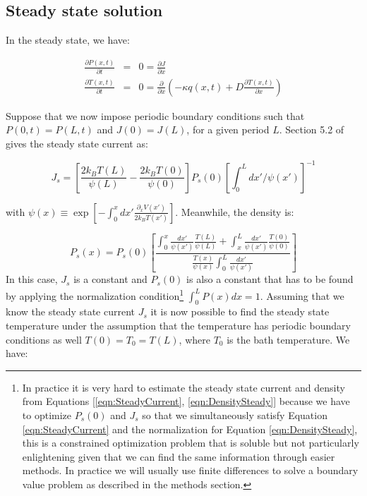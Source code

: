 \documentclass[11pt]{article} %
\begin{document}
\subsection{Steady state solution}
In the steady state, we have: 

\begin{eqnarray}
\frac{\partial P(x, t)}{\partial t} &=&  0 = \frac{\partial J}{\partial x} \label{eqn:SmoluchowskiSteady} \\
\frac{\partial T(x, t)}{\partial t} &=& 0 = \frac{\partial}{\partial x} \left ( -\kappa q(x, t) + D \frac{\partial T(x, t)}{\partial x} \right ) \label{eqn:TemperatureSteady}
\end{eqnarray} 

Suppose that we now impose periodic boundary conditions such that $P(0, t) = P(L, t)$ and $J(0) = J(L)$, for a given period $L$. Section 5.2 of \cite{Gardiner2009} gives the steady state current as:

\begin{equation}
J_s = \left [\frac{2 k_B T(L)}{\psi(L)} - \frac{2 k_B T(0)}{\psi(0)}  \right] P_s(0) \left [\int_0^L dx'/\psi(x') \right]^{-1}
\label{eqn:SteadyCurrent}
\end{equation}

with $\psi(x) \equiv \exp[-\int_0^x dx' \frac{\partial_x V(x')}{2 k_B T(x')}]$. Meanwhile, the density is:

\begin{equation}
P_s(x) = P_s(0) \left [\frac{\int_0^x \frac{dx'}{\psi(x')} \frac{T(L)}{\psi(L)} + \int_x^L \frac{dx'}{\psi(x')} \frac{T(0)}{\psi(0)} }{\frac{T(x)}{\psi(x)} \int_0^L \frac{dx'}{\psi(x')} } \right]
\label{eqn:DensitySteady}
\end{equation}
In this case, $J_s$ is a constant and $P_s(0)$ is also a constant that has to be found by applying the normalization condition\footnote{In practice it is very hard to estimate the steady state current and density from Equations [\ref{eqn:SteadyCurrent}, \ref{eqn:DensitySteady}] because we have to optimize $P_s(0)$ and $J_s$ so that we simultaneously satisfy Equation \ref{eqn:SteadyCurrent} and the normalization for Equation \ref{eqn:DensitySteady}, this is a constrained optimization problem that is soluble but not particularly enlightening given that we can find the same information through easier methods. In practice we will usually use finite differences to solve a boundary value problem as described in the methods section.} 
$\int_0^L P(x) dx = 1$. Assuming that we know the steady state current $J_s$ it is now possible to find the steady state temperature under the assumption that the temperature has periodic boundary conditions as well $T(0) = T_0 = T(L)$, where $T_0$ is the bath temperature. We have:
\end{document}
